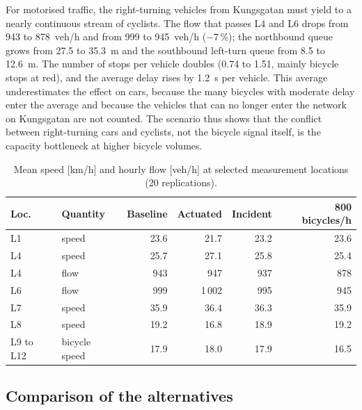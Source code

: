 \documentclass[11pt,a4paper]{article}
\begin{document}
For motorised traffic, the right-turning vehicles from Kungsgatan must yield to a nearly continuous
stream of cyclists. The flow that passes L4 and L6 drops from 943 to 878~veh/h and from 999 to
945~veh/h ($-7\,\%$); the northbound queue grows from 27.5 to 35.3~m and the southbound left-turn
queue from 8.5 to 12.6~m. The number of stops per vehicle doubles (0.74 to 1.51, mainly bicycle
stops at red), and the average delay rises by 1.2~s per vehicle. This average underestimates the
effect on cars, because the many bicycles with moderate delay enter the average and because the
vehicles that can no longer enter the network on Kungsgatan are not counted. The scenario thus
shows that the conflict between right-turning cars and cyclists, not the bicycle signal itself, is
the capacity bottleneck at higher bicycle volumes.

\begin{table}[!htb]
\centering
\caption[Speeds and flows at selected locations]{Mean speed [km/h] and hourly flow [veh/h] at
selected measurement locations (20 replications).}
\label{tab:altloc}
\small
\begin{tabular}{llrrrr}
\toprule
\textbf{Loc.} & \textbf{Quantity} & \textbf{Baseline} & \textbf{Actuated} & \textbf{Incident} & \textbf{800 bicycles/h}\\
\midrule
L1        & speed         & 23.6 & 21.7   & 23.2 & 23.6\\
L4        & speed         & 25.7 & 27.1   & 25.8 & 25.4\\
L4        & flow          & 943  & 947    & 937  & 878\\
L6        & flow          & 999  & 1\,002 & 995  & 945\\
L7        & speed         & 35.9 & 36.4   & 36.3 & 35.9\\
L8        & speed         & 19.2 & 16.8   & 18.9 & 19.2\\
L9 to L12 & bicycle speed & 17.9 & 18.0   & 17.9 & 16.5\\
\bottomrule
\end{tabular}
\end{table}

\subsection{Comparison of the alternatives}
\end{document}
